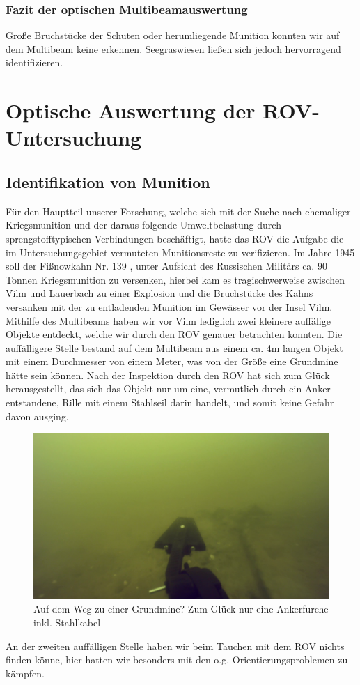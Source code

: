 \subsubsection{Fazit der optischen Multibeamauswertung}
Große Bruchstücke der Schuten oder herumliegende Munition konnten wir auf dem Multibeam keine erkennen. Seegraswiesen ließen sich jedoch hervorragend identifizieren. \\

\section{Optische Auswertung der ROV-Untersuchung}
\subsection{Identifikation von Munition}
Für den Hauptteil unserer Forschung, welche sich mit der Suche nach ehemaliger Kriegsmunition und der daraus folgende Umweltbelastung durch sprengstofftypischen Verbindungen beschäftigt,
hatte das ROV die Aufgabe die im Untersuchungsgebiet vermuteten Munitionsreste zu verifizieren. 
Im Jahre 1945 soll der Fißnowkahn Nr. 139 , unter Aufsicht des Russischen Militärs ca. 90 Tonnen Kriegsmunition zu versenken, hierbei kam es tragischwerweise zwischen Vilm und Lauerbach zu einer Explosion und die Bruchstücke des Kahns versanken mit der zu entladenden Munition im Gewässer vor der Insel Vilm.
Mithilfe des Multibeams haben wir vor Vilm lediglich zwei kleinere auffälige Objekte entdeckt, welche wir durch den ROV genauer betrachten konnten. Die auffälligere Stelle bestand auf dem Multibeam aus einem ca. 4m langen Objekt mit einem Durchmesser von einem Meter, was von der Größe eine Grundmine hätte sein können.
Nach der Inspektion durch den ROV hat sich zum Glück herausgestellt, das sich das Objekt nur um eine, vermutlich durch ein Anker entstandene, Rille mit einem Stahlseil darin handelt, und somit keine Gefahr davon ausging.
\begin{figure}[htb]
\includegraphics[height=\textheight,%
                   width=\textwidth,%
                   keepaspectratio]{Bilder/ROV/Stahlankerkabel.png}
\caption{Auf dem Weg zu einer Grundmine? Zum Glück nur eine Ankerfurche inkl. Stahlkabel}
\end{figure}
An der zweiten auffälligen Stelle haben wir beim Tauchen mit dem ROV nichts finden könne, hier hatten wir besonders mit den o.g. Orientierungsproblemen zu kämpfen.

